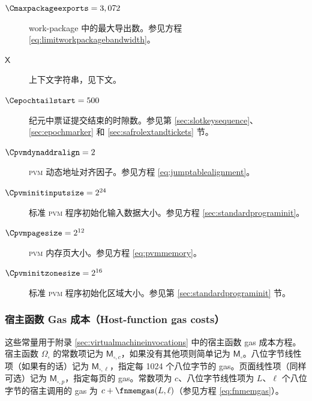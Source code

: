 \begin{description}
  \item[$\Cmaxpackageexports = 3,072$] work-package 中的最大导出数。参见方程 \ref{eq:limitworkpackagebandwidth}。
  \item[$\mathsf{X}$] 上下文字符串，见下文。
  \item[$\Cepochtailstart = 500$] 纪元中票证提交结束的时隙数。参见第 \ref{sec:slotkeysequence}、\ref{sec:epochmarker} 和 \ref{sec:safrolextandtickets} 节。
  \item[$\Cpvmdynaddralign = 2$] \textsc{pvm} 动态地址对齐因子。参见方程 \ref{eq:jumptablealignment}。
  \item[$\Cpvminitinputsize = 2^{24}$] 标准 \textsc{pvm} 程序初始化输入数据大小。参见方程 \ref{sec:standardprograminit}。
  \item[$\Cpvmpagesize = 2^{12}$] \textsc{pvm} 内存页大小。参见方程 \ref{eq:pvmmemory}。
  \item[$\Cpvminitzonesize = 2^{16}$] 标准 \textsc{pvm} 程序初始化区域大小。参见第 \ref{sec:standardprograminit} 节。
\end{description}

\subsubsection{宿主函数 Gas 成本（Host-function gas costs）}

这些常量用于附录 \ref{sec:virtualmachineinvocations} 中的宿主函数 gas 成本方程。宿主函数 $\Omega_\square$ 的常数项记为 $\mathsf{M}_{\square,c}$，如果没有其他项则简单记为 $\mathsf{M}_\square$。八位字节线性项（如果有的话）记为 $\mathsf{M}_{\square,\ell}$，指定每 1024 个八位字节的 gas。页面线性项（同样可选）记为 $\mathsf{M}_{\square,p}$，指定每页的 gas。常数项为 $c$、八位字节线性项为 $L$、$\ell$ 个八位字节的宿主调用的 gas 为 $c + \fnmemgas(L, \ell)$（参见方程 \ref{eq:fnmemgas}）。

